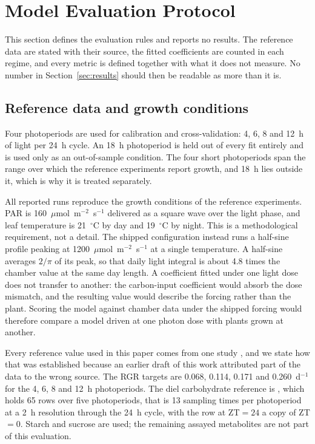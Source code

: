 \section{Model Evaluation Protocol}
\label{sec:protocol}

This section defines the evaluation rules and reports no results. The reference
data are stated with their source, the fitted coefficients are counted in each
regime, and every metric is defined together with what it does not measure. No
number in Section~\ref{sec:results} should then be readable as more than it is.

\subsection{Reference data and growth conditions}

Four photoperiods are used for calibration and cross-validation: 4, 6, 8 and
12~h of light per 24~h cycle. An 18~h photoperiod is held out of every fit
entirely and is used only as an out-of-sample condition. The four short
photoperiods span the range over which the reference experiments report growth,
and 18~h lies outside it, which is why it is treated separately.

All reported runs reproduce the growth conditions of the reference experiments.
PAR is 160~$\mu$mol~m$^{-2}$~s$^{-1}$ delivered as a square wave over the light
phase, and leaf temperature is 21~$^\circ$C by day and 19~$^\circ$C by night.
This is a methodological requirement, not a detail. The shipped configuration
instead runs a half-sine profile peaking at
1200~$\mu$mol~m$^{-2}$~s$^{-1}$ at a single temperature. A half-sine averages
$2/\pi$ of its peak, so that daily light integral is about 4.8 times the chamber
value at the same day length. A coefficient fitted under one light dose does not
transfer to another:
the carbon-input coefficient would absorb the dose mismatch, and the resulting
value would describe the forcing rather than the plant. Scoring the model
against chamber data under the shipped forcing would therefore compare a model
driven at one photon dose with plants grown at another.

Every reference value used in this paper comes from one study
\citep{Sulpice2014}, and we state how that was established because an earlier
draft of this work attributed part of the data to the wrong source. The RGR
targets are 0.068, 0.114, 0.171 and 0.260~d$^{-1}$ for the 4, 6, 8 and 12~h
photoperiods. The diel carbohydrate reference is
, which holds 65 rows over five
photoperiods, that is 13 sampling times per photoperiod at a 2~h resolution
through the 24~h cycle, with the row at ZT${}=24$ a copy of ZT${}=0$. Starch and
sucrose are used; the remaining assayed metabolites are not part of this
evaluation.

